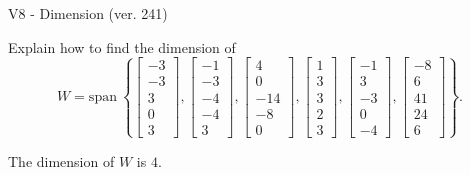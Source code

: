 \begin{exercise}
  \begin{exerciseTitle}V8 - Dimension (ver. 241)\end{exerciseTitle}
  \begin{exerciseStatement}
    Explain how to find the dimension of 
\[W=\mathrm{span}\ \left\{\left[\begin{array}{r}
-3 \\
-3 \\
3 \\
0 \\
3
\end{array}\right] , \left[\begin{array}{r}
-1 \\
-3 \\
-4 \\
-4 \\
3
\end{array}\right] , \left[\begin{array}{r}
4 \\
0 \\
-14 \\
-8 \\
0
\end{array}\right] , \left[\begin{array}{r}
1 \\
3 \\
3 \\
2 \\
3
\end{array}\right] , \left[\begin{array}{r}
-1 \\
3 \\
-3 \\
0 \\
-4
\end{array}\right] , \left[\begin{array}{r}
-8 \\
6 \\
41 \\
24 \\
6
\end{array}\right]\right\}.\]



  \end{exerciseStatement}
  \begin{exerciseAnswer}
   The dimension of \(W\) is  \(4\).
  


  \end{exerciseAnswer}
\end{exercise}